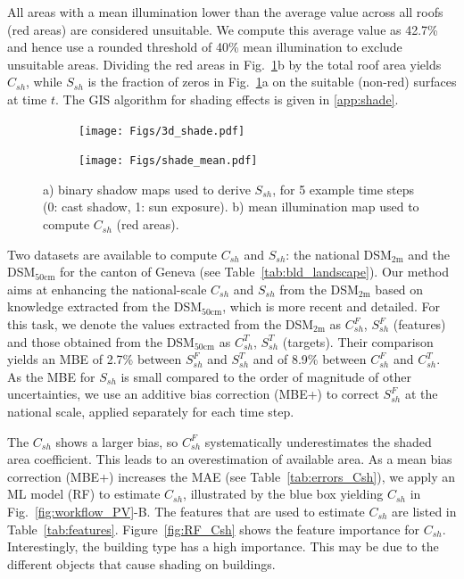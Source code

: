 All areas with a mean illumination lower than the average value across all roofs (red areas) are considered unsuitable. 
We compute this average value as 42.7\% and hence use a rounded threshold of 40\% mean illumination to exclude unsuitable areas.
Dividing the red areas in Fig.~\ref{fig:horizons}b by the total roof area yields $C_{sh}$, while $S_{sh}$ is the fraction of zeros in Fig.~\ref{fig:horizons}a on the suitable (non-red) surfaces at time $t$. The GIS algorithm for shading effects is given in \ref{app:shade}. 

\begin{figure}[tb]
	\centering
	\begin{subfigure}{.52\textwidth}
		\centering
		\texttt{[image: Figs/3d\_shade.pdf]} 
		\subcaption{}
	\end{subfigure}
	\begin{subfigure}{.44\textwidth}
		\centering
		\texttt{[image: Figs/shade\_mean.pdf]}  
		\subcaption{}
	\end{subfigure}
	\caption{a) binary shadow maps used to derive $S_{sh}$, for 5 example time steps (0: cast shadow, 1: sun exposure). b) mean illumination map used to compute $C_{sh}$ (red areas).}
	\label{fig:horizons}
\end{figure}

Two datasets are available to compute $C_{sh}$ and $S_{sh}$: the national DSM$_{2\text{m}}$ and the DSM$_{50\text{cm}}$ for the canton of Geneva (see Table~\ref{tab:bld_landscape}). Our method aims at enhancing the national-scale $C_{sh}$ and $S_{sh}$ from the DSM$_{2\text{m}}$ based on knowledge extracted from the DSM$_{50\text{cm}}$, which is more recent and detailed. For this task, we denote the values extracted from the DSM$_{2\text{m}}$ as $C_{sh}^F$, $S_{sh}^F$ (features) and those obtained from the DSM$_{50\text{cm}}$ as $C_{sh}^T$, $S_{sh}^T$ (targets).
%
Their comparison yields an MBE of 2.7\% between $S_{sh}^F$ and $S_{sh}^T$ and of 8.9\% between $C_{sh}^F$ and $C_{sh}^T$. As the MBE for $S_{sh}$ is small compared to the order of magnitude of other uncertainties, we use an additive bias correction (MBE+) to correct $S_{sh}^F$ at the national scale, applied separately for each time step. 

The $C_{sh}$ shows a larger bias, so $C_{sh}^F$ systematically underestimates the shaded area coefficient. This leads to an overestimation of available area. 
As a mean bias correction (MBE+) increases the MAE (see Table~\ref{tab:errors_Csh}), we apply an ML model (RF) to estimate $C_{sh}$, illustrated by the blue box yielding $C_{sh}$ in Fig.~\ref{fig:workflow_PV}-B. 
The features that are used to estimate  $C_{sh}$ are listed in Table~\ref{tab:features}.
Figure~\ref{fig:RF_Csh} shows the feature importance for $C_{sh}$. Interestingly, the building type has a high importance. This may be due to the different objects that cause shading on buildings. 

